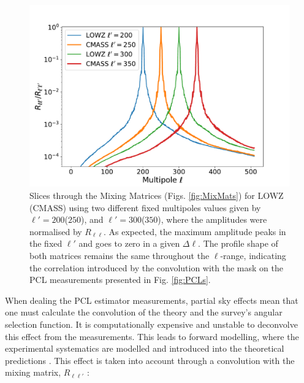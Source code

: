 \begin{figure}
\begin{center}
\includegraphics[scale=0.45]{BOSS-FIGS/Rll_200_300.pdf}
\caption[Slices through the Mixing Matrices.]{Slices through the Mixing Matrices (Figs. \ref{fig:MixMats}) for LOWZ (CMASS) using two different fixed multipoles values given by $\ell'=200$($250$), and $\ell'=300$($350$), where the amplitudes were normalised by $R_{\ell\ell}$. As expected, the maximum amplitude peaks in the fixed $\ell'$ and goes to zero in a given $\Delta\ell$. The profile shape of both matrices remains the same throughout the $\ell$-range, indicating the correlation introduced by the convolution with the mask on the PCL measurements presented in Fig. \ref{fig:PCLs}.}
\label{fig:Rll_slice}
\end{center}
\end{figure}

When dealing the PCL estimator measurements, partial sky effects mean that one must calculate the convolution of the theory and the survey's angular selection function. It is computationally expensive and unstable to deconvolve this effect from the measurements. This leads to forward modelling, where the experimental systematics are modelled and introduced into the theoretical predictions \citep{ScharfLahav1992,FisherLahav1994,Thomas2011}. This effect is taken into account through a convolution with the mixing matrix, $R_{\ell \ell'}$ \citep{Peebles1973_2,PolSpice2001,PolSpice2005,Blake2007}:

